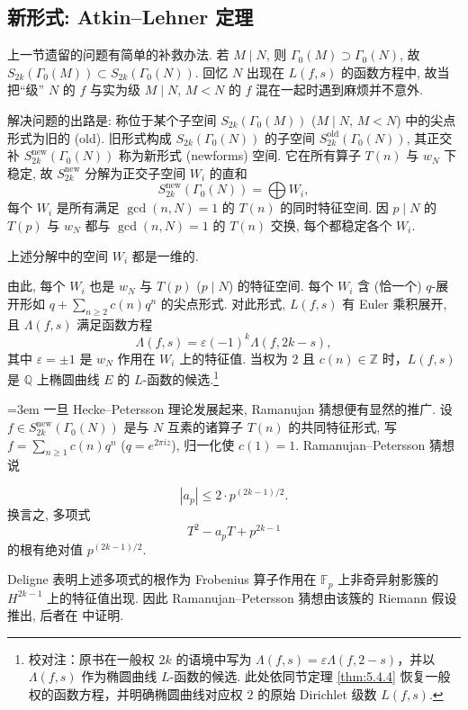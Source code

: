 \subsection*{新形式: Atkin--Lehner 定理}

上一节遗留的问题有简单的补救办法. 若 $M\mid N$, 则 $\Gamma_0(M)\supset\Gamma_0(N)$, 故 $S_{2k}(\Gamma_0(M))\subset S_{2k}(\Gamma_0(N))$. 回忆 $N$ 出现在 $L(f, s)$ 的函数方程中, 故当把``级'' $N$ 的 $f$ 与实为级 $M\mid N$, $M < N$ 的 $f$ 混在一起时遇到麻烦并不意外.

解决问题的出路是: 称位于某个子空间 $S_{2k}(\Gamma_0(M))$ ($M\mid N$, $M < N$) 中的尖点形式为旧的 (old). 旧形式构成 $S_{2k}(\Gamma_0(N))$ 的子空间 $S_{2k}^{\mathrm{old}}(\Gamma_0(N))$, 其正交补 $S_{2k}^{\mathrm{new}}(\Gamma_0(N))$ 称为新形式 (newforms) 空间. 它在所有算子 $T(n)$ 与 $w_N$ 下稳定, 故 $S_{2k}^{\mathrm{new}}$ 分解为正交子空间 $W_i$ 的直和
\[
S_{2k}^{\mathrm{new}}(\Gamma_0(N)) = \bigoplus W_i,
\]
每个 $W_i$ 是所有满足 $\gcd(n, N) = 1$ 的 $T(n)$ 的同时特征空间. 因 $p\mid N$ 的 $T(p)$ 与 $w_N$ 都与 $\gcd(n, N) = 1$ 的 $T(n)$ 交换, 每个都稳定各个 $W_i$.

\begin{theorem} \label{thm:5.4.20}
上述分解中的空间 $W_i$ 都是一维的.
\end{theorem}

由此, 每个 $W_i$ 也是 $w_N$ 与 $T(p)$ ($p\mid N$) 的特征空间. 每个 $W_i$ 含 (恰一个) $q$-展开形如 $q + \sum_{n\ge 2}c(n)q^n$ 的尖点形式. 对此形式, $L(f, s)$ 有 Euler 乘积展开, 且 $\Lambda(f, s)$ 满足函数方程
\[
\Lambda(f, s) = \varepsilon(-1)^k\Lambda(f, 2k-s),
\]
其中 $\varepsilon = \pm 1$ 是 $w_N$ 作用在 $W_i$ 上的特征值. 当权为 $2$ 且 $c(n)\in\mathbb{Z}$ 时，$L(f,s)$ 是 $\mathbb{Q}$ 上椭圆曲线 $E$ 的 $L$-函数的候选.\footnote{校对注：原书在一般权 $2k$ 的语境中写为 $\Lambda(f,s)=\varepsilon\Lambda(f,2-s)$，并以 $\Lambda(f,s)$ 作为椭圆曲线 $L$-函数的候选. 此处依同节定理 \ref{thm:5.4.4} 恢复一般权的函数方程，并明确椭圆曲线对应权 $2$ 的原始 Dirichlet 级数 $L(f,s)$.}

\begin{remark} \label{thm:5.4.21}
{\emergencystretch=3em 一旦 Hecke--Petersson 理论发展起来, Ramanujan 猜想便有显然的推广. 设 $f\in S_{2k}^{\mathrm{new}}(\Gamma_0(N))$ 是与 $N$ 互素的诸算子 $T(n)$ 的共同特征形式, 写 $f = \sum_{n\ge 1}c(n)q^n$ ($q = e^{2\pi iz}$), 归一化使 $c(1) = 1$. Ramanujan--Petersson 猜想说\par}
\[
|a_p|\le 2\cdot p^{(2k-1)/2}.
\]
换言之, 多项式
\[
T^2 - a_pT + p^{2k-1}
\]
的根有绝对值 $p^{(2k-1)/2}$.

Deligne \cite{deligne1971} 表明上述多项式的根作为 Frobenius 算子作用在 $\mathbb{F}_p$ 上非奇异射影簇的 $H^{2k-1}$ 上的特征值出现. 因此 Ramanujan--Petersson 猜想由该簇的 Riemann 假设推出, 后者在 \cite{deligne1974} 中证明.
\end{remark}


